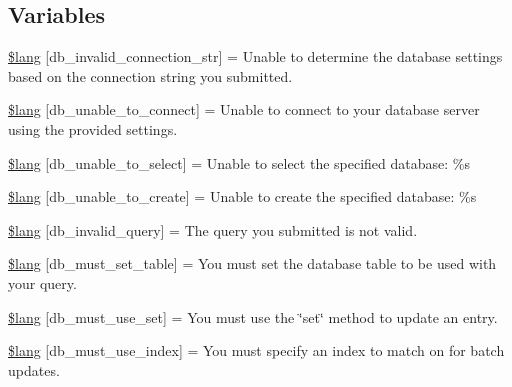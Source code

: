 \subsection*{Variables}
\begin{DoxyCompactItemize}
\item 
\mbox{\hyperlink{db__lang_8php_a76d5998046a2a744fb884f1639d93b79}{\$lang}} \mbox{[}\textquotesingle{}db\+\_\+invalid\+\_\+connection\+\_\+str\textquotesingle{}\mbox{]} = \textquotesingle{}Unable to determine the database settings based on the connection string you submitted.\textquotesingle{}
\item 
\mbox{\hyperlink{db__lang_8php_ac10d44746d16ba23ecc0cd039b445952}{\$lang}} \mbox{[}\textquotesingle{}db\+\_\+unable\+\_\+to\+\_\+connect\textquotesingle{}\mbox{]} = \textquotesingle{}Unable to connect to your database server using the provided settings.\textquotesingle{}
\item 
\mbox{\hyperlink{db__lang_8php_a17fcd377fc12d3e77485014ed048e6ad}{\$lang}} \mbox{[}\textquotesingle{}db\+\_\+unable\+\_\+to\+\_\+select\textquotesingle{}\mbox{]} = \textquotesingle{}Unable to select the specified database\+: \%s\textquotesingle{}
\item 
\mbox{\hyperlink{db__lang_8php_ac18fdbc5da2d0428ec36f8b46789e542}{\$lang}} \mbox{[}\textquotesingle{}db\+\_\+unable\+\_\+to\+\_\+create\textquotesingle{}\mbox{]} = \textquotesingle{}Unable to create the specified database\+: \%s\textquotesingle{}
\item 
\mbox{\hyperlink{db__lang_8php_a08032c0aec25a34f912d6cc70f8fd99e}{\$lang}} \mbox{[}\textquotesingle{}db\+\_\+invalid\+\_\+query\textquotesingle{}\mbox{]} = \textquotesingle{}The query you submitted is not valid.\textquotesingle{}
\item 
\mbox{\hyperlink{db__lang_8php_a17d476a693b28e6705cd91e5e2d7a201}{\$lang}} \mbox{[}\textquotesingle{}db\+\_\+must\+\_\+set\+\_\+table\textquotesingle{}\mbox{]} = \textquotesingle{}You must set the database table to be used with your query.\textquotesingle{}
\item 
\mbox{\hyperlink{db__lang_8php_a10d5fbc7d872a2c1f28bd931f35c02af}{\$lang}} \mbox{[}\textquotesingle{}db\+\_\+must\+\_\+use\+\_\+set\textquotesingle{}\mbox{]} = \textquotesingle{}You must use the \char`\"{}set\char`\"{} method to update an entry.\textquotesingle{}
\item 
\mbox{\hyperlink{db__lang_8php_a65cbeda9bba673d61682c6974f27ac2a}{\$lang}} \mbox{[}\textquotesingle{}db\+\_\+must\+\_\+use\+\_\+index\textquotesingle{}\mbox{]} = \textquotesingle{}You must specify an index to match on for batch updates.\textquotesingle{}

\end{DoxyCompactItemize}
